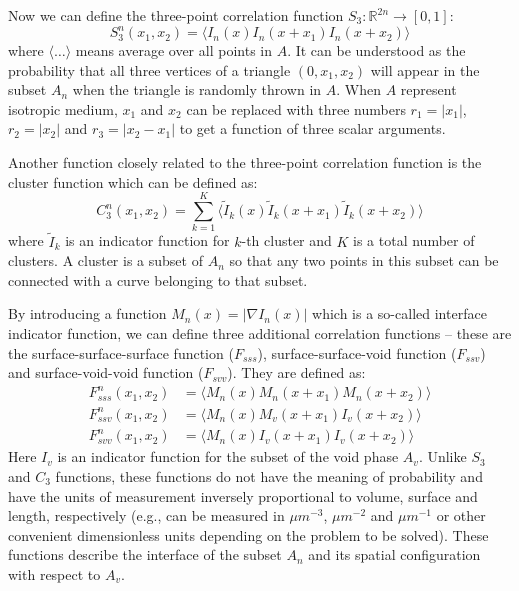 \documentclass[reprint,amsmath,amssymb,aps,pre,showkeys,showpacs]{revtex4-1}
\begin{document}
Now we can define the three-point correlation function
$S_3: \mathbb{R}^{2n} \rightarrow [0, 1]$:
\begin{equation}
  S_3^n(x_1, x_2) = \langle I_n(x) I_n(x + x_1) I_n(x + x_2) \rangle
\end{equation}
where $\langle \dots \rangle$ means average over all points in $A$. It can be
understood as the probability that all three vertices of a triangle
$(0, x_1, x_2)$ will appear in the subset $A_n$ when the triangle is randomly
thrown in $A$. When $A$ represent isotropic medium, $x_1$ and $x_2$ can be
replaced with three numbers $r_1 = |x_1|$, $r_2 = |x_2|$ and $r_3 = |x_2 - x_1|$
to get a function of three scalar arguments.

Another function closely related to the three-point correlation function is the
cluster function which can be defined as:
\begin{equation}
  C_3^n(x_1, x_2) = \sum_{k=1}^K \langle \tilde{I}_k(x) \tilde{I}_k(x + x_1)
  \tilde{I}_k(x + x_2) \rangle
\end{equation}
where $\tilde{I}_k$ is an indicator function for $k$-th cluster and $K$ is a
total number of clusters. A cluster is a subset of $A_n$ so that any two points
in this subset can be connected with a curve belonging to that subset.

By introducing a function $M_n(x) = |\nabla I_n(x)|$ which is a so-called interface
indicator function, we can define three additional
correlation functions -- these are the surface-surface-surface function
($F_{sss}$), surface-surface-void function ($F_{ssv}$) and surface-void-void
function ($F_{svv}$). They are defined as:
\begin{align}
  F_{sss}^n(x_1, x_2) &= \langle M_n(x) M_n(x + x_1) M_n(x + x_2) \rangle \\
  F_{ssv}^n(x_1, x_2) &= \langle M_n(x) M_v(x + x_1) I_v(x + x_2) \rangle \\
  F_{svv}^n(x_1, x_2) &= \langle M_n(x) I_v(x + x_1) I_v(x + x_2) \rangle
\end{align}
Here $I_v$ is an indicator function for the subset of the void phase
$A_v$. Unlike $S_3$ and $C_3$ functions, these functions do not have the meaning
of probability and have the units of measurement inversely proportional to
volume, surface and length, respectively (e.g., can be measured in $\mu m^{-3}$, $\mu m^{-2}$ and
$\mu m^{-1}$ or other convenient dimensionless units depending on the problem to be solved). 
These functions describe the interface of the subset $A_n$ and
its spatial configuration with respect to $A_v$.
\end{document}
